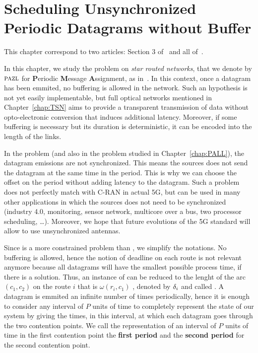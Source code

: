 
\chapter{Scheduling Unsynchronized Periodic Datagrams without Buffer}
\label{chap:PAZL}
\minitoc


This chapter correspond to two articles: Section $3$ of~\cite{DBLP:conf/ict/BarthGLMS18} and all of~\cite{DBLP:journals/corr/abs-2002-07606}.


 In this chapter, we study the problem \pazl on \emph{star routed networks}, that we denote by $\textsc{pazl}$ for \textbf{P}eriodic \textbf{M}essage \textbf{A}ssignment, as in~\cite{DBLP:journals/corr/abs-2002-07606}.
 In this context, once a datagram has been emmited, no buffering is allowed in the network. Such an hypothesis is not yet easily implementable, but full optical networks mentioned in Chapter~\ref{chap:TSN} aims to provide a transparent transmission of data without opto-electronic conversion that induces additional latency. 
 Moreover, if some buffering is necessary but its duration is deterministic, it can be encoded into the length of the links.

 In the problem \pma (and also in the problem \pall studied in Chapter~\ref{chap:PALL}), the datagram emissions are not synchronized. This means the sources does not send the datagram at the same time in the period. This is why we can choose the offset on the period without adding latency to the datagram. Such a problem does not perfectly match with C-RAN in actual 5G, but can be used in many other applications in which the sources does not need to be synchronized (industry 4.0, monitoring, sensor network, multicore over a bus, two processor scheduling, \dots).  Moreover, we hope that future evolutions of the 5G standard will allow to use unsynchronized antennas.

 Since \pma is a more constrained problem than \pall, we simplify the notations. No buffering is allowed, hence the notion of deadline on each route is not relevant anymore because all datagrams will have the smallest possible process time, if there is a solution. Thus, an instance of \pma can be reduced to the lenght of the arc $(c_1,c_2)$ on the route $i$ that is $\omega(r_i,c_1)$ , denoted by $\delta_i$ and called \nomdelay. A datagram is emmited an infinite number of times periodically, hence it is enough to consider any interval of $P$ units of time to completely represent the state of our system by giving the times, in this interval, at which each datagram goes through the two contention points. We call the representation of an interval of $P$ units of time in the first contention point the \textbf{first period} and the \textbf{second period} for the second contention point. 

